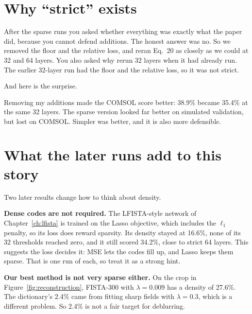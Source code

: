 \section{Why ``strict'' exists}

After the sparse runs you asked whether everything was exactly what the paper did, because you cannot
defend additions. The honest answer was no. So we removed the floor and the relative loss, and reran
Eq.~20 as closely as we could at 32 and 64 layers. You also asked why rerun 32 layers when it had already
run. The earlier 32-layer run had the floor and the relative loss, so it was not strict.

And here is the surprise.

\begin{keyidea}
Removing my additions made the COMSOL score better: 38.9\% became 35.4\% at the same 32 layers. The sparse
version looked far better on simulated validation, but lost on COMSOL. Simpler was better, and it is
also more defensible.
\end{keyidea}

\section{What the later runs add to this story}

Two later results change how to think about density.

\textbf{Dense codes are not required.} The LFISTA-style network of Chapter~\ref{ch:lfista} is trained on the Lasso objective,
which includes the $\ell_1$ penalty, so its loss does reward sparsity. Its density stayed at 16.6\%, none of its 32
thresholds reached zero, and it still scored 34.2\%, close to strict 64 layers. This suggests the loss decides it: MSE lets
the codes fill up, and Lasso keeps them sparse. That is one run of each, so treat it as a strong hint.

\textbf{Our best method is not very sparse either.} On the crop in Figure~\ref{fig:reconstruction}, FISTA-300 with
$\lambda=0.009$ has a density of 27.6\%. The dictionary's 2.4\% came from fitting sharp fields with $\lambda=0.3$, which is a
different problem. So 2.4\% is not a fair target for deblurring.
